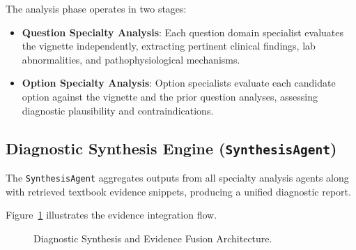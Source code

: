 The analysis phase operates in two stages:
\begin{itemize}
    \item \textbf{Question Specialty Analysis}: Each question domain specialist evaluates the vignette independently, extracting pertinent clinical findings, lab abnormalities, and pathophysiological mechanisms.
    \item \textbf{Option Specialty Analysis}: Option specialists evaluate each candidate option against the vignette and the prior question analyses, assessing diagnostic plausibility and contraindications.
\end{itemize}

\subsection{Diagnostic Synthesis Engine (\texttt{SynthesisAgent})}

The \texttt{SynthesisAgent} aggregates outputs from all specialty analysis agents along with retrieved textbook evidence snippets, producing a unified diagnostic report.

Figure~\ref{fig:synthesis_flow} illustrates the evidence integration flow.

\begin{figure}[htbp]
\centering
{}
\caption{Diagnostic Synthesis and Evidence Fusion Architecture.}
\label{fig:synthesis_flow}
\end{figure}

